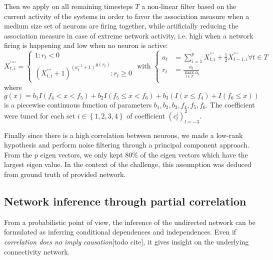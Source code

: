 \documentclass[wcp]{jmlr}
\begin{document}
Then we apply on all remaining timesteps $T$ a non-linear filter based on the current
activity of the systems in order to favor the association measure when
a medium size set of neurons are firing together, while artificially
reducing the association measure in case of extreme network activity,
i.e. high when a network firing is happening and low when no neuron is
active:
\begin{equation}
X^{\prime\prime\prime\prime}_{t,i} =
\left\{
  \begin{array}{l}
    1  : r_t < 0\\
    {(X^{\prime\prime\prime}_{t,i} + 1)^{(a_t^{-1} + 1)}}^{g(r_t)} : r_t \geq 0
  \end{array}
\right.
\text{ with }
\left\{
  \begin{array}{ll}
    a_t &= \sum_{i=1}^p X^{\prime\prime\prime}_{t,i} +
                       \frac{1}{2} X^{\prime\prime\prime}_{t-1,i} \forall t \in T\\
    r_t &= \frac{a_t}{\max_{l \in T}{a_l}} \\
  \end{array}
\right.
\end{equation}
where $g(x) = b_1 I(f_4 < x < f_5) + b_2  I(f_5 \leq x < f_6) +
b_3 (I(x\leq f_4) + I(f_ 6 \leq x))$ is a piecewise continuous function of
parameters $b_1, b_2, b_3, f_4, f_5, f_6$. The coefficient were tuned
for each set $i\in\left\{1, 2, 3, 4\right\}$ of coefficient
$\left(c_l^i\right)_{l=-3}^2$.

Finally since there is a high correlation between neurons, we made a
low-rank hypothesis and perform noise filtering through a principal component
approach. From the $p$ eigen vectors, we only kept $80\%$ of
the eigen vectors which have the largest eigen value. In the context of the
challenge, this assumption was deduced from ground truth of provided network.

\subsection{Network inference through partial correlation}
\label{sec:inference}

From a probabilistic point of view, the inference of the undirected network
can be formulated as inferring conditional dependences and independences. Even
if \textit{correlation does no imply causation}[todo cite], it gives insight
on the underlying connectivity network.
\end{document}
